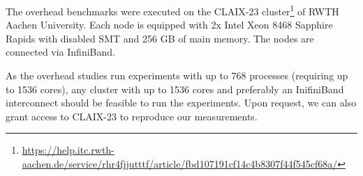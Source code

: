 \documentclass[twoside]{article}
\begin{document}
The overhead benchmarks were executed on the CLAIX-23 cluster\footnote{\url{https://help.itc.rwth-aachen.de/service/rhr4fjjutttf/article/fbd107191cf14c4b8307f44f545cf68a/}} of RWTH Aachen University. Each node is equipped with 2x Intel Xeon 8468 Sapphire Rapids with disabled SMT and 256 GB of main memory. The nodes are connected via InfiniBand.

As the overhead studies run experiments with up to 768 processes (requiring up to 1536 cores), any cluster with up to 1536 cores and preferably an InifiniBand interconnect should be feasible to run the experiments. Upon request, we can also grant access to CLAIX-23 to reproduce our measurements.
\end{document}
